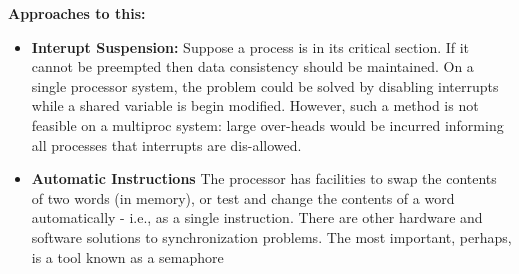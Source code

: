 \documentclass[a4paper, 10pt]{article}
\begin{document}
\textbf{Approaches to this:}
\begin{itemize}
    \item \textbf{Interupt Suspension:} Suppose a process is in its critical section. If it cannot be preempted then data consistency should be maintained. On a single processor system, the problem could be solved by disabling interrupts while a shared variable is begin modified. However, such a method is not feasible on a multiproc system: large over-heads would be incurred informing all processes that interrupts are dis-allowed.
    \item \textbf{Automatic Instructions} The processor has facilities to swap the contents of two words (in memory), or test and change the contents of a word automatically -  i.e., as a single instruction. There are other hardware and software solutions to synchronization problems. The most important, perhaps, is a tool known as a semaphore
\end{itemize}
\end{document}
